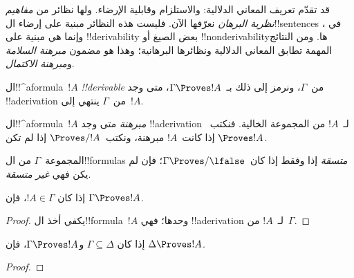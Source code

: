 \documentclass[../../../include/open-logic-section]{subfiles}
\begin{document}
      {}
      {}


\begin{explain}
قد تقدّم تعريف المعاني الدلالية:
 والاستلزام وقابلية الإرضاء.
ولها نظائر من \emph{مفاهيم نظرية البرهان} نعرّفها الآن.
فليست هذه النظائر مبنية على إرضاء ال!!{sentence}s في
، وإنما هي مبنية على
!!{derivability} بعض الصيغ أو !!{nonderivability}ها.
ومن النتائج المهمة تطابق المعاني الدلالية ونظائرها البرهانية؛
وهذا هو مضمون \emph{مبرهنة السلامة} و\emph{مبرهنة الاكتمال}.
\end{explain}

\begin{defn}[!!^{derivability}]
ال!!^a{formula}~$!A$ \emph{!!{derivable}} من~$\Gamma$،
ونرمز إلى ذلك بـ~$\Gamma \Proves !A$، متى وجد !!a{derivation}
من~$\Gamma$ ينتهي إلى~$!A$.
\end{defn}

\begin{defn}[المبرهنات]
ال!!^a{formula}~$!A$ \emph{مبرهنة} متى وجد !!a{derivation}
لـ~$!A$ من المجموعة الخالية. فنكتب~$\Proves !A$ إذا كانت~$!A$
مبرهنة، ونكتب~$\Proves/ !A$ إذا لم تكن.
\end{defn}

\begin{defn}[الاتساق]
المجموعة~$\Gamma$ من ال!!{formula}s \emph{متسقة} إذا وفقط إذا
كان~$\Gamma\Proves/ \lfalse$؛ فإن لم يكن فهي \emph{غير متسقة}.
\end{defn}

\begin{prop}[الانعكاسية]
إذا كان $!A \in \Gamma$، فإن $\Gamma \Proves !A$.
\end{prop}

\begin{proof}
  يكفي أخذ ال!!{formula}~$!A$ وحدها؛ فهي !!a{derivation}
  لـ~$!A$ من~$\Gamma$.
\end{proof}

\begin{prop}[الرتابة]
إذا كان $\Gamma \subseteq \Delta$ و$\Gamma \Proves !A$، فإن $\Delta
\Proves !A$.
\end{prop}

\begin{proof}
\end{proof}
\end{document}
